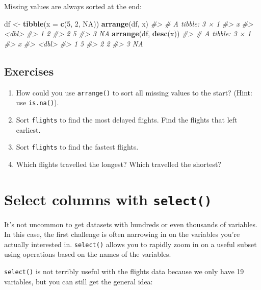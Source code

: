 \documentclass[]{book}
\newenvironment{Shaded}{\begin{snugshade}}{\end{snugshade}}
\newcommand{\KeywordTok}[1]{\textcolor[rgb]{0.13,0.29,0.53}{\textbf{{#1}}}}
\newcommand{\DataTypeTok}[1]{\textcolor[rgb]{0.13,0.29,0.53}{{#1}}}
\newcommand{\DecValTok}[1]{\textcolor[rgb]{0.00,0.00,0.81}{{#1}}}
\newcommand{\StringTok}[1]{\textcolor[rgb]{0.31,0.60,0.02}{{#1}}}
\newcommand{\CommentTok}[1]{\textcolor[rgb]{0.56,0.35,0.01}{\textit{{#1}}}}
\newcommand{\OtherTok}[1]{\textcolor[rgb]{0.56,0.35,0.01}{{#1}}}
\newcommand{\NormalTok}[1]{{#1}}
\begin{document}
Missing values are always sorted at the end:

\begin{Shaded}
\begin{Highlighting}[]
\NormalTok{df <-}\StringTok{ }\KeywordTok{tibble}\NormalTok{(}\DataTypeTok{x =} \KeywordTok{c}\NormalTok{(}\DecValTok{5}\NormalTok{, }\DecValTok{2}\NormalTok{, }\OtherTok{NA}\NormalTok{))}
\KeywordTok{arrange}\NormalTok{(df, x)}
\CommentTok{#> # A tibble: 3 × 1}
\CommentTok{#>       x}
\CommentTok{#>   <dbl>}
\CommentTok{#> 1     2}
\CommentTok{#> 2     5}
\CommentTok{#> 3    NA}
\KeywordTok{arrange}\NormalTok{(df, }\KeywordTok{desc}\NormalTok{(x))}
\CommentTok{#> # A tibble: 3 × 1}
\CommentTok{#>       x}
\CommentTok{#>   <dbl>}
\CommentTok{#> 1     5}
\CommentTok{#> 2     2}
\CommentTok{#> 3    NA}
\end{Highlighting}
\end{Shaded}

\subsection{Exercises}\label{exercises-8}

\begin{enumerate}
\def\labelenumi{\arabic{enumi}.}
\item
  How could you use \texttt{arrange()} to sort all missing values to the
  start? (Hint: use \texttt{is.na()}).
\item
  Sort \texttt{flights} to find the most delayed flights. Find the
  flights that left earliest.
\item
  Sort \texttt{flights} to find the fastest flights.
\item
  Which flights travelled the longest? Which travelled the shortest?
\end{enumerate}

\section{\texorpdfstring{Select columns with
\texttt{select()}}{Select columns with select()}}\label{select-columns-with-select}

It's not uncommon to get datasets with hundreds or even thousands of
variables. In this case, the first challenge is often narrowing in on
the variables you're actually interested in. \texttt{select()} allows
you to rapidly zoom in on a useful subset using operations based on the
names of the variables.

\texttt{select()} is not terribly useful with the flights data because
we only have 19 variables, but you can still get the general idea:
\end{document}
